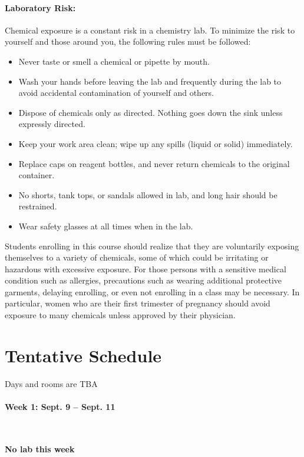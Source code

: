 \documentclass[12pt, letterpaper]{article}
\begin{document}
\paragraph{Laboratory Risk:}
Chemical exposure is a constant risk in a chemistry lab. To minimize the risk to yourself and those around you, the following rules must be followed:
\begin{itemize}
	\item Never taste or smell a chemical or pipette by mouth.
	\item Wash your hands before leaving the lab and frequently during the lab to avoid accidental contamination of yourself and others.
	\item Dispose of chemicals only as directed. Nothing goes down the sink unless expressly directed.
	\item Keep your work area clean; wipe up any spills (liquid or solid) immediately.
	\item Replace caps on reagent bottles, and never return chemicals to the original container.
	\item No shorts, tank tops, or sandals allowed in lab, and long hair should be restrained.
	\item Wear safety glasses at all times when in the lab.
\end{itemize}
Students enrolling in this course should realize that they are voluntarily exposing themselves to a variety of chemicals, some of which could be irritating or hazardous with excessive exposure.  For those persons with a sensitive medical condition such as allergies, precautions such as wearing additional protective garments, delaying enrolling, or even not enrolling in a class may be necessary.  In particular, women who are their first trimester of pregnancy should avoid exposure to many chemicals unless approved by their physician.

\section*{Tentative Schedule}
\begin{description}
	\item Days and rooms are TBA
\end{description}

\paragraph*{Week 1: Sept. 9 -- Sept. 11}~

\textbf{No lab this week}
\end{document}
